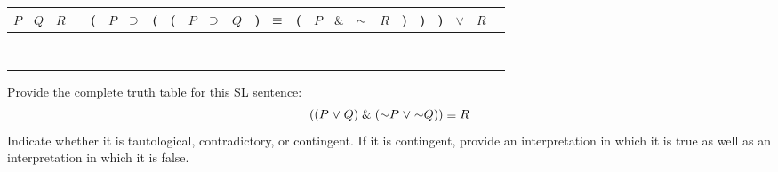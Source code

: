 \begin{tabular}{@{ }c@{ }@{ }c@{ }@{ }c | c@{ }@{}c@{}@{ }c@{ }@{ }c@{ }@{}c@{}@{}c@{}@{ }c@{ }@{ }c@{ }@{ }c@{ }@{}c@{}@{ }c@{ }@{}c@{}@{ }c@{ }@{ }c@{ }@{ }c@{ }@{ }c@{ }@{}c@{}@{}c@{}@{}c@{}@{ }c@{ }@{ }c@{ }@{ }c}
$P$ & $Q$ & $R$ &  & ( & $P$ & $\supset $ & ( & ( & $P$ & $\supset $ & $Q$ & ) & $\equiv $ & ( & $P$ & $\&$ & $\enot$ & $R$ & ) & ) & ) & $\lor$ & $R$ & \\
\hline 
 &  &  &  &  &  &  &  &  &  &  &  &  &  &  &  &  &  &  &  &  &  &  & & \\
 &  &  &  &  &  &  &  &  &  &  &  &  &  &  &  &  &  &  &  &  &  &  & & \\
  &  &  &  &  &  &  &  &  &  &  &  &  &  &  &  &  &  &  &  &  &  &  & & \\
 &  &  &  &  &  &  &  &  &  &  &  &  &  &  &  &  &  &  &  &  &  &  & & \\
 &  &  &  &  &  &  &  &  &  &  &  &  &  &  &  &  &  &  &  &  &  &  & & \\
  &  &  &  &  &  &  &  &  &  &  &  &  &  &  &  &  &  &  &  &  &  &  & & \\
 &  &  &  &  &  &  &  &  &  &  &  &  &  &  &  &  &  &  &  &  &  &  & & \\
  &  &  &  &  &  &  &  &  &  &  &  &  &  &  &  &  &  &  &  &  &  &  & & \\
\end{tabular}




\problempart
\label{HW3.A}
Provide the complete truth table for this SL sentence:
$$((P \eor Q) \eand (\enot P \eor \enot Q)) \eiff R$$
Indicate whether it is tautological, contradictory, or contingent. 
If it is contingent, provide an interpretation in which it is true as well as an interpretation in which it is false.



